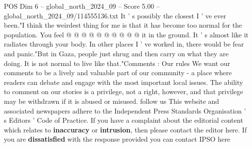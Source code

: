 \begin{textsample}{POS Dim 6 – global\_north\_2024\_09 – Score 5.00 – global\_north\_2024\_09/114555136.txt}
It ' s possibly the closest I ' ve ever been."I think the weirdest thing for me is that it has become too normal for the population.
You feel @ @ @ @ @ @ @ @ @ @ it in the ground.
It ' s almost like it radiates through your body.
In other places I ' ve worked in, there would be fear and panic."But in Gaza, people just shrug and then carry on what they are doing.
It is not normal to live like that."Comments : Our rules We want our comments to be a lively and valuable part of our community - a place where readers can debate and engage with the most important local issues.
The ability to comment on our stories is a privilege, not a right, however, and that privilege may be withdrawn if it is abused or misused. follow us This website and associated newspapers adhere to the Independent Press Standards Organisation ' s Editors ' Code of Practice.
If you have a complaint about the editorial content which relates to \textbf{inaccuracy} or \textbf{intrusion}, then please contact the editor here.
If you are \textbf{dissatisfied} with the response provided you can contact IPSO here

\end{textsample}
